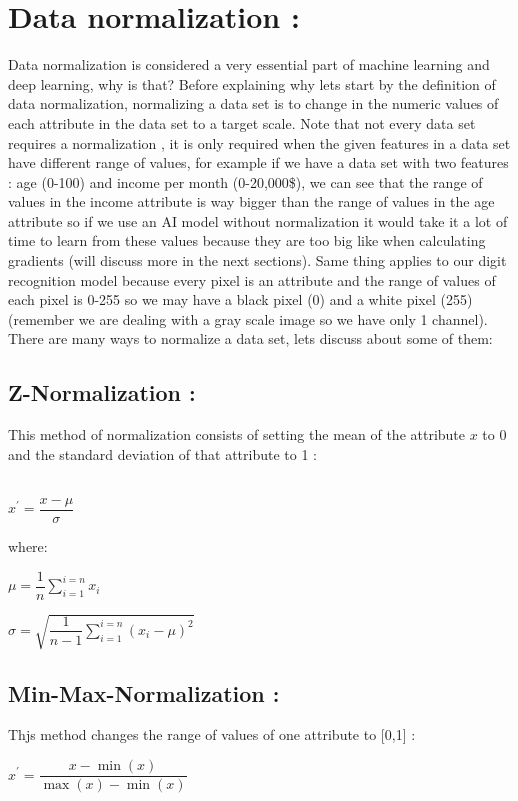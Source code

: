 \documentclass[10pt,a4paper]{article}
\begin{document}
\section{Data normalization :}
\large Data normalization is considered a very essential part of machine learning and deep learning, why is that? Before explaining why lets start by the definition of data normalization, normalizing a data set is to change in the numeric values of each attribute in the data set to a target scale. Note that not every data set requires a normalization , it is only required when the given features in a data set have different range of values, for example if we have a data set with two features : age (0-100) and income per month (0-20,000\$), we can see that the range of values in the income attribute is way bigger than the range of values in the age attribute so if we use an AI model without normalization it would take it a lot of time to learn from these values because they are too big like when calculating gradients (will discuss more in the next sections). Same thing applies to our digit recognition model because every pixel is an attribute and the range of values of each pixel is 0-255 so we may have a black pixel (0) and a white pixel (255) (remember we are dealing with a gray scale image so we have only 1 channel). There are many ways to normalize a data set, lets discuss about some of them:
\newpage
\subsection{Z-Normalization :}
This method of normalization consists of setting the mean of the attribute $x$ to 0 and the standard deviation of that attribute to 1 :\\\\
\begin{center}
$ x^{\prime} = \dfrac{x - \mu}{\sigma} $\\
\end{center}
where:
\begin{center}
$ \mu = \dfrac{1}{n}\sum_{i=1}^{i=n}x_i $
\end{center}
\begin{center}
$ \sigma = \sqrt{\dfrac{1}{n-1}\sum_{i=1}^{i=n}(x_i - \mu)^2} $
\end{center}

\subsection{Min-Max-Normalization :}
Thjs method changes the range of values of one attribute to [0,1] :\\
\begin{center}
$ x^{\prime} = \dfrac{x - \min{(x)}}{\max{(x)} - \min{(x)}} $
\end{center}
\end{document}
